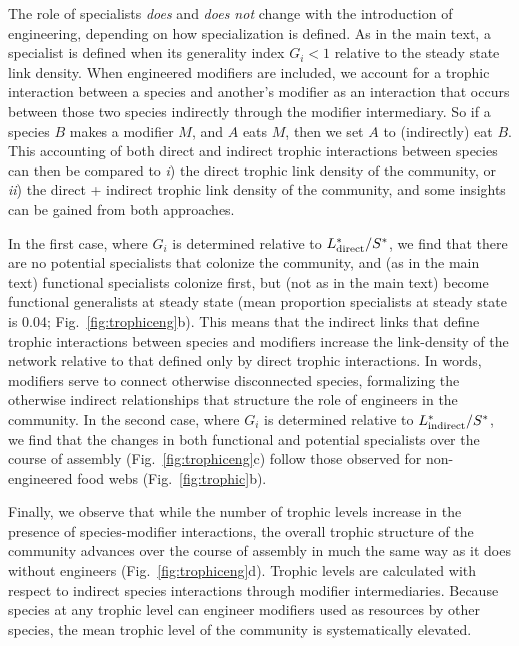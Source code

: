 \documentclass[twocolumn,preprintnumbers,amsmath,amssymb,superscriptaddress,linenumbers]{revtex4-1}
\begin{document}
The role of specialists \emph{does} and \emph{does not} change with the introduction of engineering, depending on how specialization is defined.
As in the main text, a specialist is defined when its generality index $G_i < 1$ relative to the steady state link density.
When engineered modifiers are included, we account for a trophic interaction between a species and another's modifier as an interaction that occurs between those two species indirectly through the modifier intermediary.
So if a species $B$ makes a modifier $M$, and $A$ eats $M$, then we set $A$ to (indirectly) eat $B$.
This accounting of both direct and indirect trophic interactions between species can then be compared to \emph{i}) the direct trophic link density of the community, or \emph{ii}) the direct + indirect trophic link density of the community, and some insights can be gained from both approaches.

In the first case, where $G_i$ is determined relative to $L^*_{\rm direct}/S^*$, we find that there are no potential specialists that colonize the community, and (as in the main text) functional specialists colonize first, but (not as in the main text) become functional generalists at steady state (mean proportion specialists at steady state is 0.04; Fig.\ \ref{fig:trophiceng}b).
This means that the indirect links that define trophic interactions between species and modifiers increase the link-density of the network relative to that defined only by direct trophic interactions.
In words, modifiers serve to connect otherwise disconnected species, formalizing the otherwise indirect relationships that structure the role of engineers in the community.
In the second case, where $G_i$ is determined relative to $L^*_{\rm indirect}/S^*$, we find that the changes in both functional and potential specialists over the course of assembly (Fig.\ \ref{fig:trophiceng}c) follow those observed for non-engineered food webs (Fig.\ \ref{fig:trophic}b).

Finally, we observe that while the number of trophic levels increase in the presence of species-modifier interactions, the overall trophic structure of the community advances over the course of assembly in much the same way as it does without engineers (Fig.\ \ref{fig:trophiceng}d).
Trophic levels are calculated with respect to indirect species interactions through modifier intermediaries.
Because species at any trophic level can engineer modifiers used as resources by other species, the mean trophic level of the community is systematically elevated.
\end{document}
